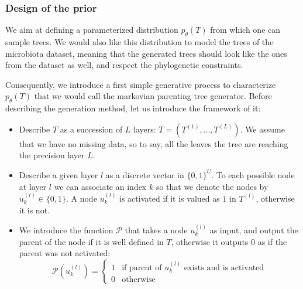 \subsubsection{Design of the prior}


We aim at defining a parameterized distribution $p_{\theta}(T)$ from which one can sample trees.
We would also like this distribution to model the trees of the microbiota dataset, meaning that
the generated trees should look like the ones from the dataset as well, and respect the phylogenetic constraints. \\

\newcommand{\nodeparent}{\mathcal{P}}

Consequently, we introduce a first simple generative process to characterize $p_{\theta}(T)$ that we would call the markovian parenting tree generator.
Before describing the generation method, let us introduce the framework of it:
\begin{itemize}
    \item Describe $T$ as a succession of $L$ layers: $T = (T^{(1)}, \dots, T^{(L)})$.
    We assume that we have no missing data, so to say, all the leaves the tree are reaching the precision layer $L$.
    \item Describe a given layer $l$ as a discrete vector in $\{0, 1\}^{U}$.
    To each possible node at layer $l$ we can associate an index $k$ so that we denote the nodes by $u_k^{(l)} \in \{0, 1\}$.
    A node $u_k^{(l)}$ is activated if it is valued as $1$ in $T^{(l)}$, otherwise it is not.
    \item We introduce the function $\nodeparent$ that takes a node $u_k^{(l)}$ as input, and output the parent of the node if it is well defined in $T$,
          otherwise it outputs $0$ as if the parent was not activated:
            $$
            \nodeparent(u_k^{(l)}) = \left\{
            \begin{array}{ll}
                1 & \mbox{if } \text{parent of $u_k^{(l)}$ exists and is activated}\\
                0 & \mbox{otherwise}
            \end{array}
            \right.
            $$
\end{itemize}

